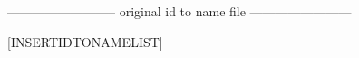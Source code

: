 

\def\LastYearPlusTwo{[INSERTLASTYEARPLUSTWO]}


\newenvironment{[INSERTFILENAME]}{%
\begin{table*}[h!]                              %
\addtocounter{table}{\TaskAddCounter}           %
\renewcommand{\arraystretch}{\SpaceBetweenRows} %
\setlength{\tabcolsep}{\SpaceBetweenColumns}    %
\begin{longtable}{T}


\end{longtable}
}
{%
\end{table*}
}



-------------------------- original id to name file ------------------------

[INSERTIDTONAMELIST]

